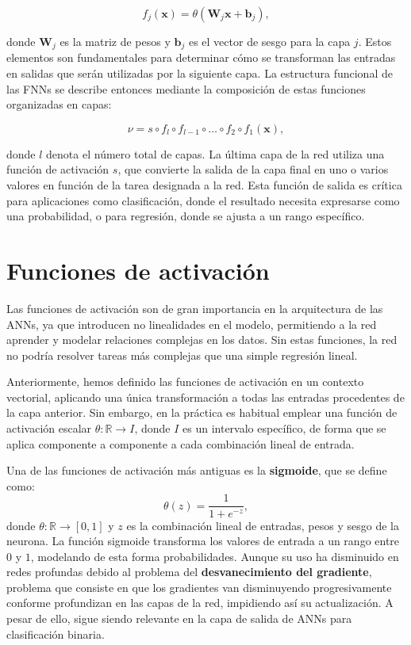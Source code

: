\[
f_{j}(\mathbf{x}) = \theta \left( \mathbf{W}_{j} \mathbf{x}+ \mathbf{b}_{j} \right
),
\]

donde $\mathbf{W}_{j}$ es la matriz de pesos y $\mathbf{b}_{j}$ es el vector de sesgo
para la capa $j$. Estos elementos son fundamentales para determinar cómo se
transforman las entradas en salidas que serán utilizadas por la siguiente capa. La
estructura funcional de las FNNs se describe entonces mediante la composición de
estas funciones organizadas en capas:

\[
\nu = s \circ f_{l} \circ f_{l-1}\circ \ldots \circ f_{2} \circ f_{1}(\mathbf{x}
),
\]

donde $l$ denota el número total de capas. La última capa de la red utiliza una función
de activación $s$, que convierte la salida de la capa final en uno o varios
valores en función de la tarea designada a la red. Esta función de salida es crítica
para aplicaciones como clasificación, donde el resultado necesita expresarse
como una probabilidad, o para regresión, donde se ajusta a un rango específico.

\section{Funciones de activación}

Las funciones de activación son de gran importancia en la arquitectura de las ANNs,
ya que introducen no linealidades en el modelo, permitiendo a la red aprender y modelar
relaciones complejas en los datos. Sin estas funciones, la red no podría resolver
tareas más complejas que una simple regresión lineal.

Anteriormente, hemos definido las funciones de activación en un contexto
vectorial, aplicando una única transformación a todas las entradas procedentes de
la capa anterior. Sin embargo, en la práctica es habitual emplear una función de
activación escalar $\theta : \mathbb{R}\rightarrow I$, donde $I$ es un intervalo
específico, de forma que se aplica componente a componente a cada combinación lineal
de entrada.

Una de las funciones de activación más antiguas es la \textbf{sigmoide}, que se define
como:
\begin{equation}
	\theta(z) = \frac{1}{1 + e^{-z}},
\end{equation}
donde $\theta : \mathbb{R}\to [0,1]$ y $z$ es la combinación lineal de entradas,
pesos y sesgo de la neurona. La función sigmoide transforma los valores de
entrada a un rango entre $0$ y $1$, modelando de esta forma probabilidades.
Aunque su uso ha disminuido en redes profundas debido al problema del \textbf{desvanecimiento
	del gradiente}, problema que consiste en que los gradientes van disminuyendo
progresivamente conforme profundizan en las capas de la red, impidiendo así su actualización.
A pesar de ello, sigue siendo relevante en la capa de salida de ANNs para clasificación
binaria.

